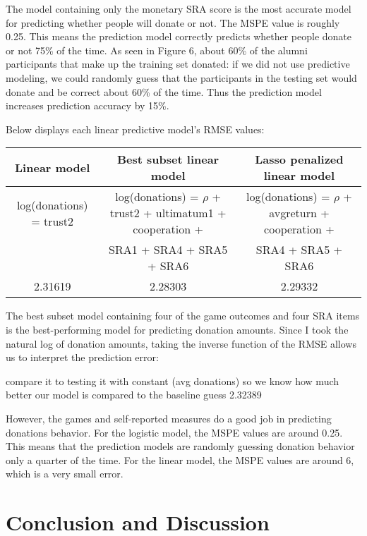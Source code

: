 \documentclass[12pt]{article}
\begin{document}
The model containing only the monetary SRA score is the most accurate model for predicting whether people will donate or not. The MSPE value is roughly 0.25. This means the prediction model correctly predicts whether people donate or not 75\% of the time. As seen in Figure 6, about 60\% of the alumni participants that make up the training set donated: if we did not use predictive modeling, we could randomly guess that the participants in the testing set would donate and be correct about 60\% of the time. Thus the prediction model increases prediction accuracy by 15\%.
 
Below displays each linear predictive model\rq s RMSE values:
 
\begin{center}
\begin{adjustbox}{width=\textwidth}
\begin{tabular}{ c | c | c }
\hline \hline
Linear model & Best subset linear model & Lasso penalized linear model \\
\hline
log(donations) = trust2 & log(donations) = \(\rho\) + trust2 + ultimatum1 + cooperation + & log(donations) = \(\rho\) + avgreturn + cooperation + \\
\small & SRA1 + SRA4 + SRA5 + SRA6 & SRA4 + SRA5 + SRA6 \\
\hline
2.31619 & 2.28303 & 2.29332 \\
\hline \hline
\end{tabular}
\end{adjustbox}
\end{center}

The best subset model containing four of the game outcomes and four SRA items is the best-performing model for predicting donation amounts. Since I took the natural log of donation amounts, taking the inverse function of the RMSE allows us to interpret the prediction error: 


compare it to testing it with constant (avg donations) so we know how much better our model is compared to the baseline guess
2.32389


However, the games and self-reported measures do a good job in predicting donations behavior. For the logistic model, the MSPE values are around 0.25. This means that the prediction models are randomly guessing donation behavior only a quarter of the time. For the linear model, the MSPE values are around 6, which is a very small error. 



\section{Conclusion and Discussion}
\end{document}
